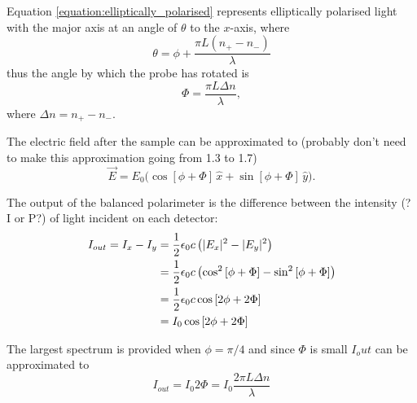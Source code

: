 Equation \ref{equation:elliptically_polarised} represents elliptically polarised light with the major axis at an angle of $\theta$ to the $x$-axis, where
\begin{equation}
\theta = \phi + \frac{\pi L (n_+ - n_-)}{\lambda}
\end{equation}
thus the angle by which the probe has rotated is
\begin{equation}
\Phi = \frac{\pi L \Delta n}{\lambda},
\end{equation}
where $\Delta n = n_+ - n_-$.

The electric field after the sample can be approximated to {\color{red}(probably don't need to make this approximation going from 1.3 to 1.7)}
\begin{equation}
\vec{E} = E_0\big(\cos\left[\phi+\Phi\right]\,\hat{x}+\sin\left[\phi+\Phi\right]\,\hat{y}\big).
\end{equation}

The output of the balanced polarimeter is the difference between the intensity {\color{red}(? I or P?)} of light incident on each detector:
\begin{align}
I_{out} = I_x - I_y &= \frac{1}{2}\epsilon_0 c \left(|E_x|^2 - |E_y|^2\right)\notag\\
&= \frac{1}{2}\epsilon_0 c \left(\cos^2\left[\phi+\Phi\right] - \sin^2\left[\phi+\Phi\right]\right)\notag\\
&= \frac{1}{2}\epsilon_0 c \cos\left[2\phi+2\Phi\right]\notag\\
&= I_0 \cos\left[2\phi+2\Phi\right]
\end{align}

The largest spectrum is provided when $\phi=\pi/4$ and since $\Phi$ is small $I_out$ can be approximated to
\begin{equation}
I_{out} = I_0 2\Phi = I_0 \frac{2\pi L \Delta n}{\lambda}
\end{equation}

